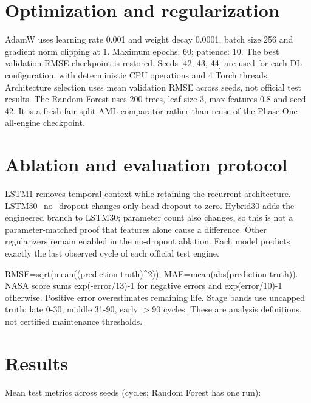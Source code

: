 \documentclass[conference]{IEEEtran}
\begin{document}
\section{Optimization and regularization}

AdamW uses learning rate 0.001 and weight decay 0.0001, batch size 256 and gradient norm clipping at 1. Maximum epochs: 60; patience: 10. The best validation RMSE checkpoint is restored. Seeds [42, 43, 44] are used for each DL configuration, with deterministic CPU operations and 4 Torch threads. Architecture selection uses mean validation RMSE across seeds, not official test results. The Random Forest uses 200 trees, leaf size 3, max-features 0.8 and seed 42. It is a fresh fair-split AML comparator rather than reuse of the Phase One all-engine checkpoint.

\section{Ablation and evaluation protocol}

LSTM1 removes temporal context while retaining the recurrent architecture. LSTM30\_no\_dropout changes only head dropout to zero. Hybrid30 adds the engineered branch to LSTM30; parameter count also changes, so this is not a parameter-matched proof that features alone cause a difference. Other regularizers remain enabled in the no-dropout ablation. Each model predicts exactly the last observed cycle of each official test engine.

RMSE=sqrt(mean((prediction-truth)\textasciicircum{}2)); MAE=mean(abs(prediction-truth)). NASA score sums exp(-error/13)-1 for negative errors and exp(error/10)-1 otherwise. Positive error overestimates remaining life. Stage bands use uncapped truth: late 0-30, middle 31-90, early $>$90 cycles. These are analysis definitions, not certified maintenance thresholds.

\section{Results}

Mean test metrics across seeds (cycles; Random Forest has one run):
\end{document}
